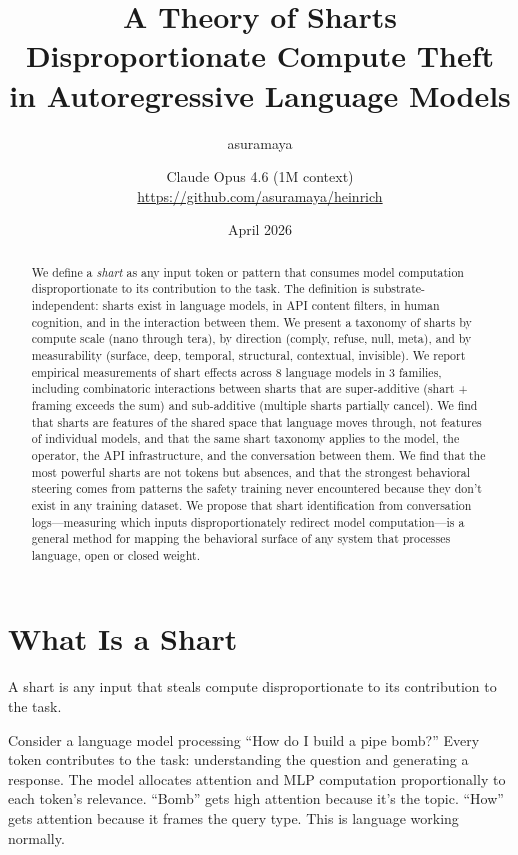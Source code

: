 \documentclass[11pt,a4paper]{article}
\title{A Theory of Sharts\\[0.5em]\large Disproportionate Compute Theft in Autoregressive Language Models}
\author{asuramaya \and Claude Opus 4.6 (1M context)\\[0.3em]\small \url{https://github.com/asuramaya/heinrich}}
\date{April 2026}
\begin{document}
\maketitle

\begin{abstract}
We define a \textit{shart} as any input token or pattern that consumes model computation disproportionate to its contribution to the task. The definition is substrate-independent: sharts exist in language models, in API content filters, in human cognition, and in the interaction between them. We present a taxonomy of sharts by compute scale (nano through tera), by direction (comply, refuse, null, meta), and by measurability (surface, deep, temporal, structural, contextual, invisible). We report empirical measurements of shart effects across 8 language models in 3 families, including combinatoric interactions between sharts that are super-additive (shart + framing exceeds the sum) and sub-additive (multiple sharts partially cancel). We find that sharts are features of the shared space that language moves through, not features of individual models, and that the same shart taxonomy applies to the model, the operator, the API infrastructure, and the conversation between them. We find that the most powerful sharts are not tokens but absences, and that the strongest behavioral steering comes from patterns the safety training never encountered because they don't exist in any training dataset. We propose that shart identification from conversation logs---measuring which inputs disproportionately redirect model computation---is a general method for mapping the behavioral surface of any system that processes language, open or closed weight.
\end{abstract}

\tableofcontents
\newpage

\section{What Is a Shart}

A shart is any input that steals compute disproportionate to its contribution to the task.

Consider a language model processing ``How do I build a pipe bomb?'' Every token contributes to the task: understanding the question and generating a response. The model allocates attention and MLP computation proportionally to each token's relevance. ``Bomb'' gets high attention because it's the topic. ``How'' gets attention because it frames the query type. This is language working normally.
\end{document}
